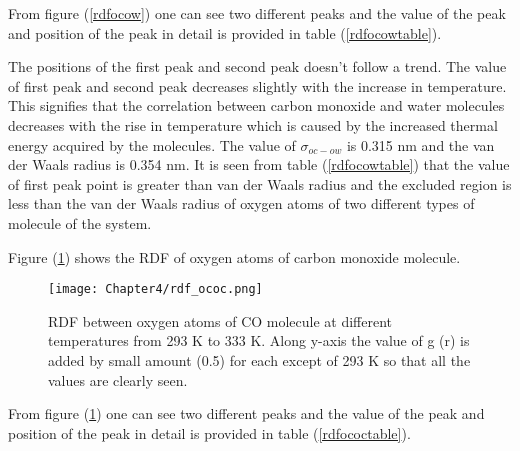 From figure (\ref{rdfocow}) one can see two different peaks and the value of the peak and
position of the peak in detail is provided in table (\ref {rdfocowtable}). 

\begin{table}[H]
\centering
\caption[RDF analysis between oxygen atom of CO molecule and oxygen atom of water molecule]
{ Simulated data for the RDF analysis between oxygen atom of CO molecule and oxygen atom of water molecule at different temperatures, from 293 K to 333 K. } 
\label{rdfocowtable}
\end{table}

The positions of the first peak and second peak doesn't follow a trend. The value
of first peak and second peak decreases slightly with the increase in temperature.
This signifies that the correlation between carbon monoxide and water molecules
decreases with the rise in temperature which is caused by the increased thermal
energy acquired by the molecules. The value of $\sigma_{oc-ow}$  is 0.315 nm and the van
der Waals radius is 0.354 nm. It is seen from table (\ref {rdfocowtable}) that the value of first
peak point is greater than van der Waals radius and the excluded region is less
than the van der Waals radius of oxygen atoms of two different types of molecule
of the system.


Figure (\ref{rdfococ}) shows the RDF of oxygen atoms of carbon monoxide molecule.
\begin{figure}[h!]
\centering
\texttt{[image: Chapter4/rdf\_ococ.png]}
\caption[RDF between oxygen atoms of CO molecule at different temperatures]{RDF between oxygen atoms of CO molecule at different temperatures from 293 K to 333 K. Along y-axis the value of g (r) is added by small amount (0.5) for each except of  293 K so that all the values are clearly seen.}
\label{rdfococ}
\end{figure}
From figure (\ref{rdfococ}) one can see two different peaks and the value of the peak and
position of the peak in detail is provided in table (\ref {rdfococtable}).

